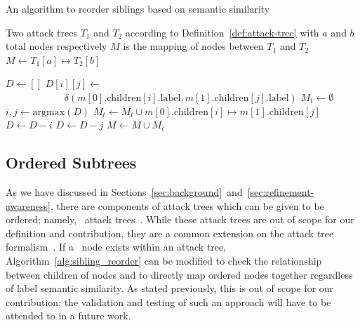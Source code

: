 \begin{algorithm}
    \caption{An algorithm to reorder siblings based on semantic similarity}
    \label{alg:sibling_reorder}
    \begin{algorithmic}
        \State Two attack trees $T_1$ and $T_2$ according to Definition~\ref{def:attack-tree} with $a$ and $b$ total nodes respectively
        \State $M$ is the mapping of nodes between $T_1$ and $T_2$ 
        \State $M \gets T_1[a]\mapsto T_2[b]$

        \State $D \gets []$ 
                \State $D[i][j] \gets$ 
                \State$\text{  }\text{  }\text{  }\text{  }\text{  }\text{  }\text{  }\text{  }\text{  }\delta(m[0].\text{children}[i].\text{label}, m[1].\text{children}[j].\text{label})$
            \EndFor
        \EndFor
        \State $M_t \gets \emptyset$  
            \State $i, j \gets \text{argmax}(D)$ 
            \State $M_t \gets M_t \cup m[0].\text{children}[i]\mapsto m[1].\text{children}[j]$
            \State $D \gets D - i$ 
            \State $D \gets D - j$ 
        \EndWhile
            \EndIf
        \EndFor
        \State $M \gets M \cup M_t$
        \EndFor
    \end{algorithmic}
    \end{algorithm}


    \subsection{Ordered Subtrees}

    As we have discussed in Sections~\ref{sec:background}~and~\ref{sec:refinement-awareness}, there are components of attack trees which can be given to be ordered; namely, \SAND\ attack trees~\cite{jhawar_attack_2015}. While these attack trees are out of scope for our definition and contribution, they are a common extension on the attack tree formalism~\cite{lallieReviewAttackGraph2020}. If a \SAND\ node exists within an attack tree, Algorithm~\ref{alg:sibling_reorder} can be modified to check the relationship between children of nodes and to directly map ordered nodes together regardless of label semantic similarity. As stated previously, this is out of scope for our contribution; the validation and testing of such an approach will have to be attended to in a future work.